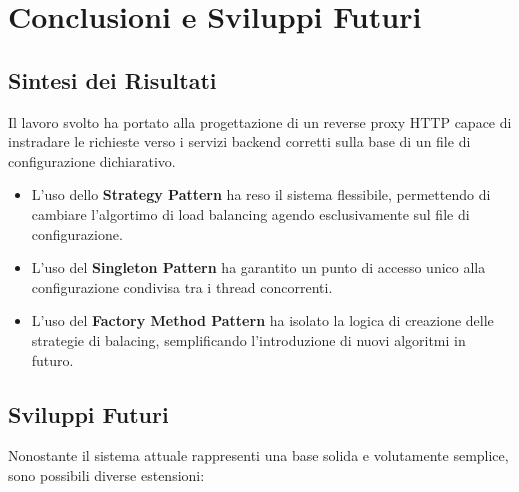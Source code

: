 \section{Conclusioni e Sviluppi Futuri}
\label{sec:conclusioni}

\subsection{Sintesi dei Risultati}

Il lavoro svolto ha portato alla progettazione di un reverse proxy HTTP capace di instradare le richieste verso i servizi backend corretti 
sulla base di un file di configurazione dichiarativo.\\

\begin{itemize}
    \item L'uso dello \textbf{Strategy Pattern} ha reso il sistema flessibile, permettendo di cambiare l'algortimo di load balancing agendo esclusivamente sul file di configurazione.
    \item L'uso del \textbf{Singleton Pattern} ha garantito un punto di accesso unico alla configurazione condivisa tra i thread concorrenti.
    \item L'uso del \textbf{Factory Method Pattern} ha isolato la logica di creazione delle strategie di balacing, semplificando l'introduzione di nuovi algoritmi in futuro.
\end{itemize}

\subsection{Sviluppi Futuri}

Nonostante il sistema attuale rappresenti una base solida e volutamente semplice, sono possibili diverse estensioni:

